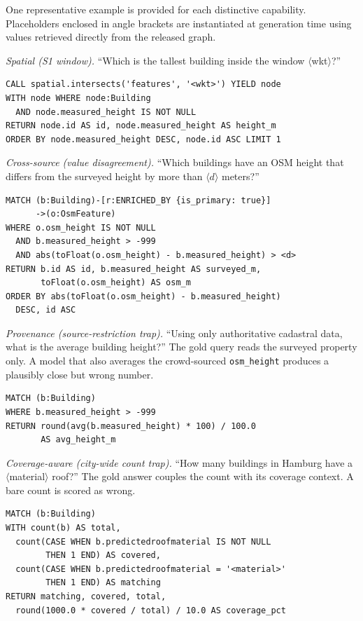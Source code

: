 \documentclass[sigconf,authordraft]{acmart}
\begin{document}
One representative example is provided for each distinctive capability. Placeholders enclosed in angle brackets are instantiated at generation time using values retrieved directly from the released graph. 

\emph{Spatial (S1 window).} ``Which is the tallest building inside the window $\langle$wkt$\rangle$?''
\begin{lstlisting}
CALL spatial.intersects('features', '<wkt>') YIELD node
WITH node WHERE node:Building
  AND node.measured_height IS NOT NULL
RETURN node.id AS id, node.measured_height AS height_m
ORDER BY node.measured_height DESC, node.id ASC LIMIT 1
\end{lstlisting}

\emph{Cross-source (value disagreement).} ``Which buildings have an OSM height that differs from the surveyed height by more than $\langle d \rangle$ meters?''
\begin{lstlisting}
MATCH (b:Building)-[r:ENRICHED_BY {is_primary: true}]
      ->(o:OsmFeature)
WHERE o.osm_height IS NOT NULL
  AND b.measured_height > -999
  AND abs(toFloat(o.osm_height) - b.measured_height) > <d>
RETURN b.id AS id, b.measured_height AS surveyed_m,
       toFloat(o.osm_height) AS osm_m
ORDER BY abs(toFloat(o.osm_height) - b.measured_height)
  DESC, id ASC
\end{lstlisting}

\emph{Provenance (source-restriction trap).} ``Using only authoritative cadastral data, what is the average building height?'' The gold query reads the surveyed property only. A model that also averages the crowd-sourced \texttt{osm\_height} produces a plausibly close but wrong number.
\begin{lstlisting}
MATCH (b:Building)
WHERE b.measured_height > -999
RETURN round(avg(b.measured_height) * 100) / 100.0
       AS avg_height_m
\end{lstlisting}

\emph{Coverage-aware (city-wide count trap).} ``How many buildings in Hamburg have a $\langle$material$\rangle$ roof?'' The gold answer couples the count with its coverage context. A bare count is scored as wrong.
\begin{lstlisting}
MATCH (b:Building)
WITH count(b) AS total,
  count(CASE WHEN b.predictedroofmaterial IS NOT NULL
        THEN 1 END) AS covered,
  count(CASE WHEN b.predictedroofmaterial = '<material>'
        THEN 1 END) AS matching
RETURN matching, covered, total,
  round(1000.0 * covered / total) / 10.0 AS coverage_pct
\end{lstlisting}
\end{document}
